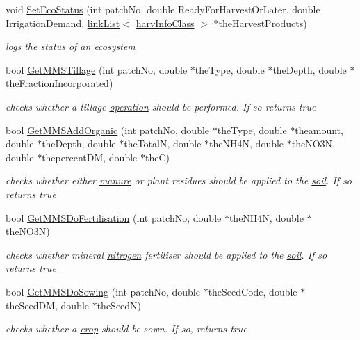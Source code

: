 \begin{DoxyCompactItemize}
void \hyperlink{class_m_m_s_class_a618f8d059a46ed238e0ef8d58207722e}{SetEcoStatus} (int patchNo, double ReadyForHarvestOrLater, double IrrigationDemand, \hyperlink{classlink_list}{linkList}$<$ \hyperlink{classharv_info_class}{harvInfoClass} $>$ $\ast$theHarvestProducts)
\begin{DoxyCompactList}\small\item\em logs the status of an \hyperlink{classecosystem}{ecosystem} \item\end{DoxyCompactList}\item 
bool \hyperlink{class_m_m_s_class_af0fdf59e2254ae73b27cbb61500a076f}{GetMMSTillage} (int patchNo, double $\ast$theType, double $\ast$theDepth, double $\ast$theFractionIncorporated)
\begin{DoxyCompactList}\small\item\em checks whether a tillage \hyperlink{classoperation}{operation} should be performed. If so returns true \item\end{DoxyCompactList}\item 
bool \hyperlink{class_m_m_s_class_a4ebfe5cbd23fa7d45df7ca9ddb226fe2}{GetMMSAddOrganic} (int patchNo, double $\ast$theType, double $\ast$theamount, double $\ast$theDepth, double $\ast$theTotalN, double $\ast$theNH4N, double $\ast$theNO3N, double $\ast$thepercentDM, double $\ast$theC)
\begin{DoxyCompactList}\small\item\em checks whether either \hyperlink{classmanure}{manure} or plant residues should be applied to the \hyperlink{classsoil}{soil}. If so returns true \item\end{DoxyCompactList}\item 
bool \hyperlink{class_m_m_s_class_af4ca114efc64eb0fc38e9bb00f1d880b}{GetMMSDoFertilisation} (int patchNo, double $\ast$theNH4N, double $\ast$theNO3N)
\begin{DoxyCompactList}\small\item\em checks whether mineral \hyperlink{classnitrogen}{nitrogen} fertiliser should be applied to the \hyperlink{classsoil}{soil}. If so returns true \item\end{DoxyCompactList}\item 
bool \hyperlink{class_m_m_s_class_aa525cef9cc6ca7af74abed81f5bcf40e}{GetMMSDoSowing} (int patchNo, double $\ast$theSeedCode, double $\ast$theSeedDM, double $\ast$theSeedN)
\begin{DoxyCompactList}\small\item\em checks whether a \hyperlink{classcrop}{crop} should be sown. If so, returns true \item\end{DoxyCompactList}\item 

\end{DoxyCompactItemize}

